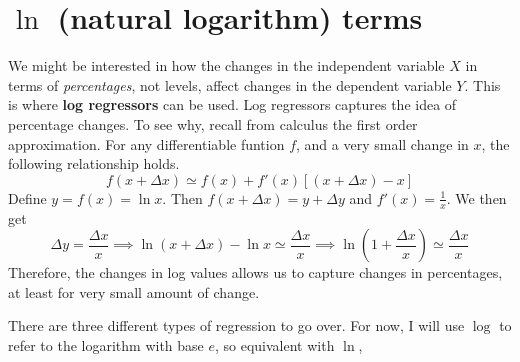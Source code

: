 

\section{$\ln$ (natural logarithm) terms}
We might be interested in how the changes in the independent variable $X$ in terms of \textit{percentages}, not levels, affect changes in the dependent variable $Y$. This is where \textbf{log regressors} can be used. Log regressors captures the idea of percentage changes. To see why, recall from calculus the first order approximation. For any differentiable funtion $f$, and a very small change in $x$, the following relationship holds. 
\[
f(x+\Delta x) \simeq f(x)+f'(x)[(x+\Delta x) -x] 
\]
Define $y=f(x)=\ln{x}$. Then $f(x+\Delta x) = y+\Delta y$ and $f'(x)=\frac{1}{x}$. We then get 
\[
\Delta y = \frac{\Delta x}{x}\implies \ln{(x+\Delta x)}-\ln{x} \simeq \frac{\Delta x}{x} \implies \ln\left(1+\frac{\Delta x}{x}\right)\simeq\frac{\Delta x}{x}
\]
Therefore, the changes in log values allows us to capture changes in percentages, at least for very small amount of change. \par\medskip
There are three different types of regression to go over. For now, I will use $\log$ to refer to the logarithm with base $e$, so equivalent with $\ln$, 
